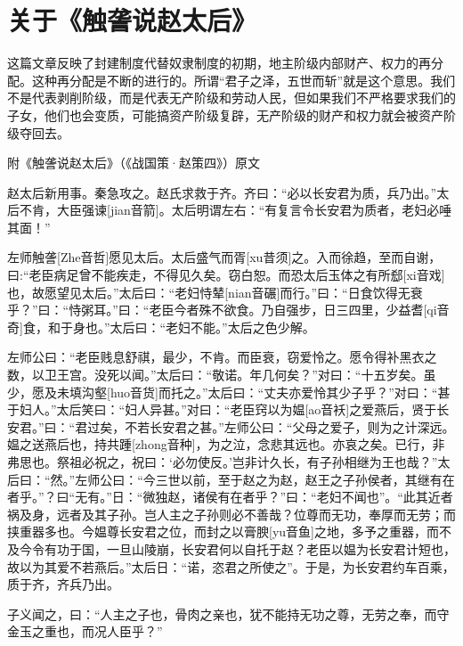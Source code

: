 \section[关于《触詟说赵太后》（一九六七年四月）]{关于《触詟说赵太后》}


这篇文章反映了封建制度代替奴隶制度的初期，地主阶级内部财产、权力的再分配。这种再分配是不断的进行的。所谓“君子之泽，五世而斩”就是这个意思。我们不是代表剥削阶级，而是代表无产阶级和劳动人民，但如果我们不严格要求我们的子女，他们也会变质，可能搞资产阶级复辟，无产阶级的财产和权力就会被资产阶级夺回去。


附《触詟说赵太后》（《战国策·赵策四》）原文

赵太后新用事。秦急攻之。赵氏求救于齐。齐曰：“必以长安君为质，兵乃出。”太后不肯，大臣强谏[jian音箭]。太后明谓左右：“有复言令长安君为质者，老妇必唾其面！”

左师触詟[Zhe音哲]愿见太后。太后盛气而胥[xu昔须]之。入而徐趋，至而自谢，曰:“老臣病足曾不能疾走，不得见久矣。窃白恕。而恐太后玉体之有所郄[xi音戏]也，故愿望见太后。”太后曰：“老妇恃辇[nian音碾]而行。”曰：“日食饮得无衰乎？”曰：“恃粥耳。”曰：“老臣今者殊不欲食。乃自强步，日三四里，少益耆[qi音奇]食，和于身也。”太后曰：“老妇不能。”太后之色少解。

左师公曰：“老臣贱息舒祺，最少，不肯。而臣衰，窃爱怜之。愿令得补黑衣之数，以卫王宫。没死以闻。”太后曰：“敬诺。年几何矣？”对曰：“十五岁矣。虽少，愿及未填沟壑[huo音货]而托之。”太后曰：“丈夫亦爱怜其少子乎？”对曰：“甚于妇人。”太后笑曰：“妇人异甚。”对曰：“老臣窍以为媪[ao音袄]之爱燕后，贤于长安君。”曰：“君过矣，不若长安君之甚。”左师公曰：“父母之爱子，则为之计深远。媪之送燕后也，持共踵[zhong音种]，为之泣，念悲其远也。亦哀之矣。已行，非弗思也。祭祖必祝之，祝曰：‘必勿使反。’岂非计久长，有子孙相继为王也哉？”太后曰：“然。”左师公曰：“今三世以前，至于赵之为赵，赵王之子孙侯者，其继有在者乎。”？曰“无有。”日：“微独赵，诸侯有在者乎？”曰：“老妇不闻也”。“此其近者祸及身，远者及其子孙。岂人主之子孙则必不善哉？位尊而无功，奉厚而无劳；而挟重器多也。今媪尊长安君之位，而封之以膏腴[yu音鱼]之地，多予之重器，而不及今令有功于国，一旦山陵崩，长安君何以自托于赵？老臣以媪为长安君计短也，故以为其爱不若燕后。”太后日：“诺，恣君之所使之”。于是，为长安君约车百乘，质于齐，齐兵乃出。

子义闻之，曰：“人主之子也，骨肉之亲也，犹不能持无功之尊，无劳之奉，而守金玉之重也，而况人臣乎？”


